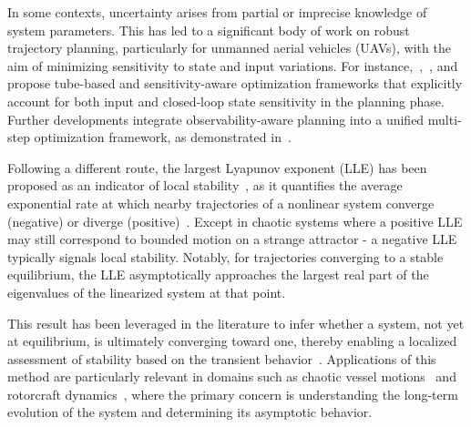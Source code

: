 In some contexts, uncertainty arises from partial or imprecise knowledge of system parameters. This has led to a significant body of work on robust trajectory planning, particularly for unmanned aerial vehicles (UAVs), with the aim of minimizing sensitivity to state and input variations. For instance,~\cite{Brault:RobustTrajectoryPlanning:2021},~\cite{Giordano:TrajectoryGenerationMinimum:2018}, and~\cite{Brault:TubebasedTrajectoryOptimization:} propose tube-based and sensitivity-aware optimization frameworks that explicitly account for both input and closed-loop state sensitivity in the planning phase. Further developments integrate observability-aware planning into a unified multi-step optimization framework, as demonstrated in~\cite{Bohm:COPControlObservabilityaware:2022}.



%

Following a different route, the largest Lyapunov exponent (LLE) has been proposed as an indicator of local stability~\cite{Meng:AnalysisGlobalCharacteristics:2022}, as it quantifies the average exponential rate at which nearby trajectories of a nonlinear system converge (negative) or diverge (positive)~\cite{Strogatz:NonlinearDynamicsChaos:2019}. Except in chaotic systems where a positive LLE may still correspond to bounded motion on a strange attractor - a negative LLE typically signals local stability. Notably, for trajectories converging to a stable equilibrium, the LLE asymptotically approaches the largest real part of the eigenvalues of the linearized system at that point.

This result has been leveraged in the literature to infer whether a system, not yet at equilibrium, is ultimately converging toward one, thereby enabling a localized assessment of stability based on the transient behavior~\cite{Sadri:StabilityAnalysisNonlinear:2013}. Applications of this method are particularly relevant in domains such as chaotic vessel motions~\cite{McCue:UseLyapunovExponents:2011} and rotorcraft dynamics~\cite{Tamer:StabilityNonlinearTimeDependent:2016,Cassoni:RotorcraftStabilityAnalysis:2024}, where the primary concern is understanding the long-term evolution of the system and determining its asymptotic behavior.

